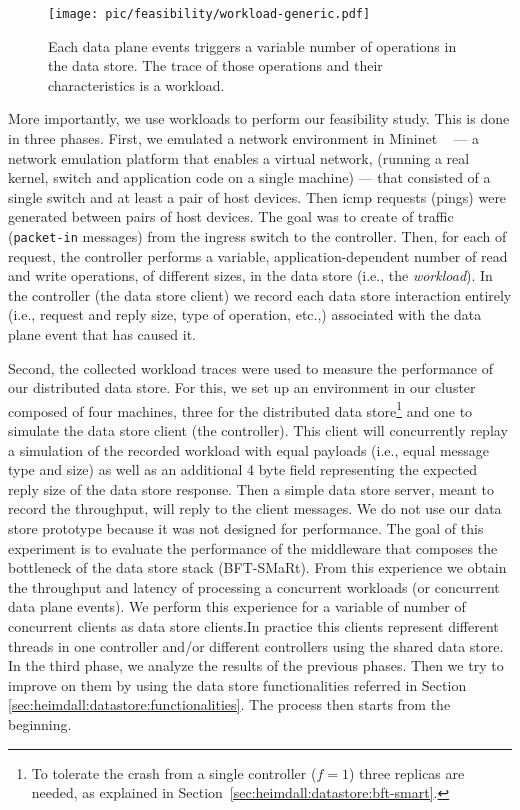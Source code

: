 \begin{figure}[ht]
  \centering
  \texttt{[image: pic/feasibility/workload-generic.pdf]}   
  \caption[Workload definition]{Each data plane events triggers a variable number of operations in the data store. The trace of those operations and their characteristics is a workload.}
  \label{fig:feasibility:workloads}
\end{figure}

More importantly, we use workloads to perform our feasibility study. This is done in three phases. 
First, we emulated a network environment in Mininet ~\cite{Handigol:2012tg} --- a network emulation platform that enables a virtual network, (running a real kernel, switch and application code on a single machine) ---  that consisted of a single switch and at least a pair of host devices.
Then \gls{icmp} requests (pings) were generated between pairs of host devices. 
The goal was to create \gls{of}  traffic (\texttt{packet-in} messages) from the ingress switch to the controller.
Then, for each \gls{of} request, the controller performs a variable, application-dependent number of read and write operations, of different sizes, in the data store (i.e., the \textit{workload}). 
In the controller  (the data store client) we record each data store interaction entirely (i.e., request and reply size, type of operation, etc.,)  associated with the data plane event that has caused it. 

Second, the collected workload traces were used to measure the performance of our distributed data store.
For this, we set up an environment in our cluster composed of four machines, three for the distributed data store\footnote{To tolerate the crash from a single controller ($f=1$) three replicas are needed, as explained in Section~\ref{sec:heimdall:datastore:bft-smart}.} and one to simulate the data store client (the controller). 
This client will concurrently replay a simulation of the recorded workload with equal payloads (i.e., equal message type and size) as well as an additional 4 byte field representing the expected reply size of the data store response. Then a simple data store server, meant to record the throughput, will reply to the client messages. We do not use our data store prototype because it was not designed for performance. The  goal of this experiment is to evaluate the performance of the middleware that  composes the bottleneck of the data store stack (BFT-SMaRt). 
From this experience we obtain the throughput and latency of processing a concurrent workloads (or concurrent data plane events).  We perform this experience for a variable of number of concurrent clients as data store clients.In practice this clients represent different threads in one controller and/or different controllers using the shared data store. 
In the third phase, we analyze the results of the previous phases. Then we try to improve on them by using the data store functionalities referred in Section \ref{sec:heimdall:datastore:functionalities}. The process then starts from the beginning.  

